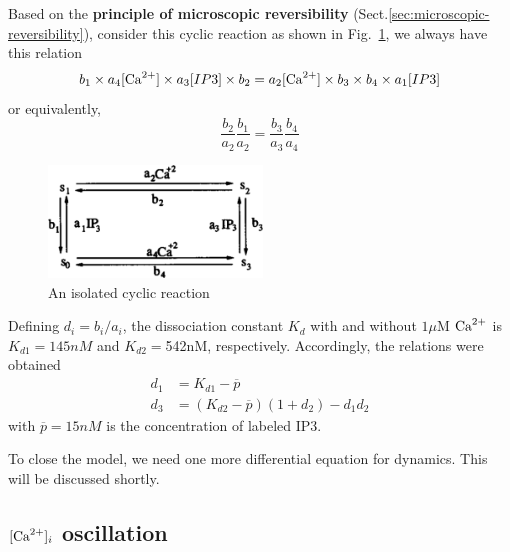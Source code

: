 Based on the {\bf principle of microscopic reversibility}
(Sect.\ref{sec:microscopic-reversibility}),  consider this cyclic reaction as
shown in Fig.~\ref{fig:cyclic_reaction}, we always have this relation
\begin{equation}
  \label{eq:346}
  b_1\times a_4[\ce{Ca^2+}] \times a_3[IP3]\times b_2 =
  a_2[\ce{Ca^2+}]\times b_3 \times b_4 \times a_1 [IP3]
\end{equation}
or equivalently,
\begin{equation}
  \label{eq:347}
  \frac{b_2}{a_2}\frac{b_1}{a_2} = \frac{b_3}{a_3}\frac{b_4}{a_4}
\end{equation}

\begin{figure}[hbt]
 \centerline{\includegraphics[height=3cm]{./images/cyclic_reaction.eps}}
\caption{An isolated cyclic reaction}
\label{fig:cyclic_reaction}
\end{figure}



Defining $d_i=b_i/a_i$, the dissociation constant $K_d$ with and
without $1\mu$M ${\text{Ca}^{2+}}$ is $K_{d1}=145nM$ and $K_{d2}=$542nM,
respectively. Accordingly, the relations were obtained
\begin{equation}
  \label{eq:345}
  \begin{split}
    d_1 &= K_{d1}-\overline{p} \\
    d_3 &= (K_{d2} - \overline{p})(1+d_2) - d_1d_2
  \end{split}
\end{equation}
with $\overline{p}=15nM$ is the concentration of labeled IP3. 



To close the model, we need one more differential equation for 
dynamics.  This will be discussed shortly.
 
\subsection{$[{\text{Ca}^{2+}}]_i$  oscillation}
\label{sec:ceca2-oscillation}

